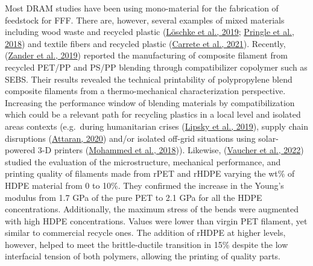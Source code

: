 \documentclass[
  12pt,
  number,
  review]{elsarticle}
\begin{document}
Most DRAM studies have been using mono-material for the fabrication of
feedstock for FFF. There are, however, several examples of mixed
materials including wood waste and recycled plastic
(\protect\hyperlink{ref-loschke2019}{Löschke et al., 2019};
\protect\hyperlink{ref-pringle2018}{Pringle et al., 2018}) and textile
fibers and recycled plastic (\protect\hyperlink{ref-carrete2021}{Carrete
et al., 2021}). Recently, (\protect\hyperlink{ref-Zander2019}{Zander et
al., 2019}) reported the manufacturing of composite filament from
recycled PET/PP and PS/PP blending through compatibilizer copolymer such
as SEBS. Their results revealed the technical printability of
polypropylene blend composite filaments from a thermo-mechanical
characterization perspective. Increasing the performance window of
blending materials by compatibilization which could be a relevant path
for recycling plastics in a local level and isolated areas contexts
(e.g.~during humanitarian crises
(\protect\hyperlink{ref-lipsky2019}{Lipsky et al., 2019}), supply chain
disruptions (\protect\hyperlink{ref-attaran2020}{Attaran, 2020}) and/or
isolated off-grid situations using solar-powered 3-D printers
(\protect\hyperlink{ref-Mohammed2018}{Mohammed et al., 2018})).
Likewise, (\protect\hyperlink{ref-vaucher2022}{Vaucher et al., 2022})
studied the evaluation of the microstructure, mechanical performance,
and printing quality of filaments made from rPET and rHDPE varying the
wt\% of HDPE material from 0 to 10\%. They confirmed the increase in the
Young's modulus from 1.7 GPa of the pure PET to 2.1 GPa for all the HDPE
concentrations. Additionally, the maximum stress of the bends were
augmented with high HDPE concentrations. Values were lower than virgin
PET filament, yet similar to commercial recycle ones. The addition of
rHDPE at higher levels, however, helped to meet the brittle-ductile
transition in 15\% despite the low interfacial tension of both polymers,
allowing the printing of quality parts.
\end{document}
